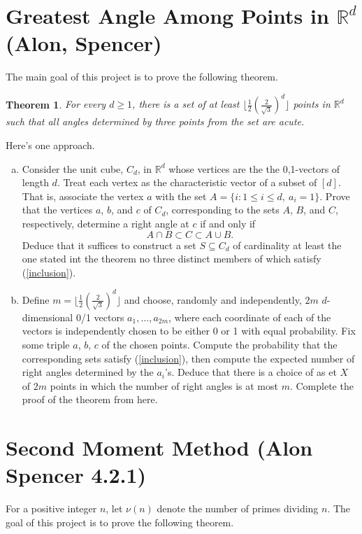 \documentclass[11pt,letterpaper]{article}
\newcommand{\reals}{\mathbb{R}}
\newtheorem{theorem}{Theorem}
\begin{document}
\section{Greatest Angle Among Points in $\reals^d$ (Alon, Spencer)}

The main goal of this project is to prove the following theorem.


\begin{theorem}
	For every $d\geq 1$, there is a set of at least $\lfloor \frac{1}{2}(\frac{2}{\sqrt{3}})^d\rfloor$ points in $\reals^d$ such that all angles determined by three points from the set are acute.
\end{theorem}

Here's one approach.

\begin{enumerate}[(a)]
	\item Consider the unit cube, $C_d$, in $\reals^d$ whose vertices are the the 0,1-vectors of length $d$. Treat each vertex as the characteristic vector of a subset of $[d]$. That is, associate the vertex $a$ with the set $A = \{i: 1\leq i\leq d,\ a_i = 1\}$. Prove that the vertices $a$, $b$, and $c$ of $C_d$, corresponding to the sets $A$, $B$, and $C$, respectively, determine a right angle at $c$ if and only if
	\begin{equation}\label{inclusion}
	A\cap B\subset C\subset A\cup B.
	\end{equation}
	Deduce that it suffices to construct a set $S\subseteq C_d$ of cardinality at least the one stated int the theorem no three distinct members of which satisfy (\ref{inclusion}).

	\item Define $m=\lfloor \frac{1}{2}(\frac{2}{\sqrt{3}})^d\rfloor$ and choose, randomly and independently, $2m$ $d$-dimensional 0/1 vectors $a_1, \ldots, a_{2m}$, where each coordinate of each of the vectors is independently chosen to be either 0 or 1 with equal probability. Fix some triple $a$, $b$, $c$ of the chosen points. Compute the probability that the corresponding sets satisfy (\ref{inclusion}), then compute the expected number of right angles determined by the $a_i$'s. Deduce that there is a choice of as et $X$ of $2m$ points in which the number of right angles is at most $m$. Complete the proof of the theorem from here.
\end{enumerate}



\section{Second Moment Method (Alon Spencer 4.2.1)}
For a positive integer $n$, let $\nu(n)$ denote the number of primes dividing $n$. The goal of this project is to prove the following theorem.
\end{document}
